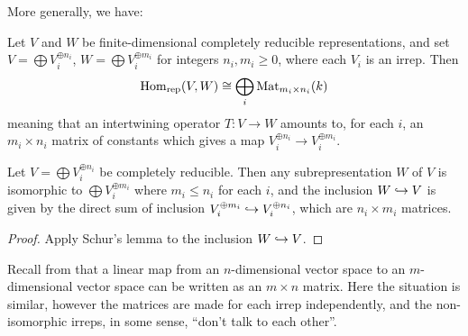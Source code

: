 More generally, we have:
\begin{theorem}
	\label{thm:compred_schur}
	Let $V$ and $W$ be finite-dimensional completely reducible representations,
	and set $V = \bigoplus V_i^{\oplus n_i}$, $W = \bigoplus V_i^{\oplus m_i}$
	for integers $n_i, m_i \ge 0$, where each $V_i$ is an irrep.
	Then
	\[ \operatorname{Hom}_{\mathrm{rep}}(V, W)
		\cong \bigoplus_i \mathrm{Mat}_{m_i \times n_i}(k) \]
	meaning that an intertwining operator $T \colon V \to W$
	amounts to, for each $i$, an $m_i \times n_i$ matrix of constants
	which gives a map $V_i^{\oplus n_i} \to V_i^{\oplus m_i}$.
\end{theorem}

\begin{corollary}
	\label{cor:subrep_schur}
	Let $V = \bigoplus V_i^{\oplus n_i}$ be completely reducible.
	Then any subrepresentation $W$ of $V$ is isomorphic
	to $\bigoplus V_i^{\oplus m_i}$ where $m_i \le n_i$ for each $i$,
	and the inclusion $W \hookrightarrow V$ is given
	by the direct sum of inclusion $V_i^{\oplus m_i} \hookrightarrow V_i^{\oplus n_i}$,
	which are $n_i \times m_i$ matrices.
\end{corollary}
\begin{proof}
	Apply Schur's lemma to the inclusion $W \hookrightarrow V$.
\end{proof}
Recall from  that a linear map from an
$n$-dimensional vector space to an $m$-dimensional vector space can be written as
an $m \times n$ matrix. Here the situation is similar, however the matrices are
made for each irrep independently, and the non-isomorphic irreps, in some sense,
``don't talk to each other''.


